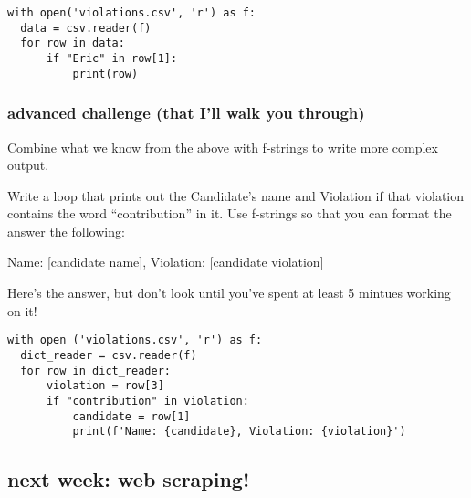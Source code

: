 \documentclass[11pt]{article}
\begin{document}
\begin{verbatim}
with open('violations.csv', 'r') as f:
  data = csv.reader(f)
  for row in data:
      if "Eric" in row[1]:
          print(row)
\end{verbatim}

\subsubsection{advanced challenge (that I'll walk you through)}
\label{sec:org9669b28}
Combine what we know from the above with f-strings to write more
complex output.

Write a loop that prints out the Candidate’s name and Violation if
that violation contains the word “contribution” in it. Use f-strings
so that you can format the answer the following:

Name: [candidate name], Violation: [candidate violation]

Here’s the answer, but don’t look until you’ve spent at least 5
mintues working on it!

\begin{verbatim}
with open ('violations.csv', 'r') as f:
  dict_reader = csv.reader(f)
  for row in dict_reader:
      violation = row[3]
      if "contribution" in violation:
          candidate = row[1]
          print(f'Name: {candidate}, Violation: {violation}')
\end{verbatim}


\subsection{next week: web scraping!}
\label{sec:org4836bfd}
\end{document}
